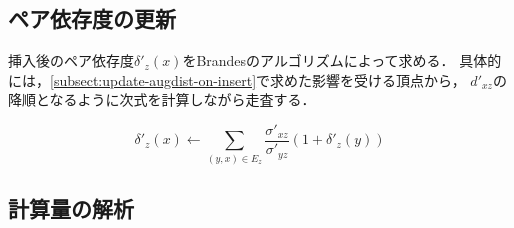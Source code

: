 \subsection{ペア依存度の更新}
\label{subsect:update-delta-on-insert}

挿入後のペア依存度$\delta'_z(x)$をBrandesのアルゴリズムによって求める．
具体的には，\ref{subsect:update-augdist-on-insert}で求めた影響を受ける頂点から，
$d'_{xz}$の降順となるように次式を計算しながら走査する．

\[ \delta'_{z}(x)\gets\sum_{(y,x)\in E_z}\frac{\sigma'_{xz}}{\sigma'_{yz}}(1+\delta'_z(y)) \]

\subsection{計算量の解析}
\label{subsect:computational-complexity-of-incremental-algorithm}

